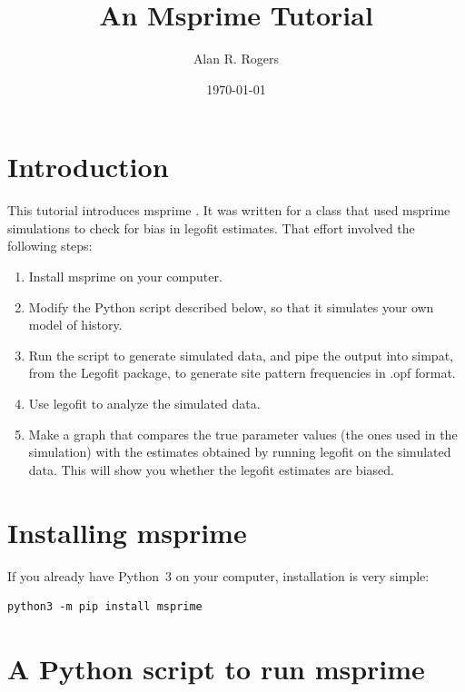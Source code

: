\documentclass[11pt]{article}
\begin{document}
\title{An Msprime Tutorial}
\author{Alan R. Rogers}
\date{\today}
\maketitle

\section{Introduction}
\label{sec.intro}
This tutorial introduces msprime \citep{Kelleher:PLO-12-1}. It was
written for a class that used msprime simulations to check for bias in
legofit estimates. That effort involved the following steps:
\begin{enumerate}
\item Install msprime on your computer.
\item Modify the Python script described below, so that it simulates
  your own model of history.
\item Run the script to generate simulated data, and pipe the output
  into simpat, from the Legofit package, to generate site pattern
  frequencies in .opf format.
\item Use legofit to analyze the simulated data.
\item Make a graph that compares the true parameter values (the ones
  used in the simulation) with the estimates obtained by running
  legofit on the simulated data. This will show you whether the
  legofit estimates are biased.
\end{enumerate}

\section{Installing msprime}
If you already have Python~3 on your computer, installation is very
simple:
\begin{verbatim}
python3 -m pip install msprime
\end{verbatim}


\section{A Python script to run msprime}
\end{document}
